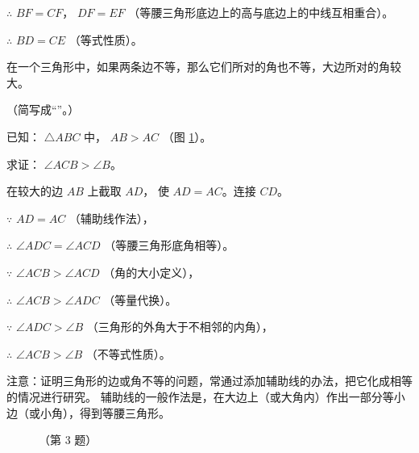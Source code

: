 $\therefore$ \quad $BF = CF$， $DF = EF$ （等腰三角形底边上的高与底边上的中线互相重合）。

$\therefore$ \quad $BD = CE$ （等式性质）。



%     

\liti \begin{xingzhi}
    在一个三角形中，如果两条边不等，那么它们所对的角也不等，大边所对的角较大。
\end{xingzhi}（简写成“”。）

已知： $\triangle ABC$ 中， $AB > AC$ （图 \ref{fig:czjh1-3-34}）。

求证： $\angle ACB > \angle B$。

\zhengming 在较大的边 $AB$ 上截取 $AD$， 使 $AD = AC$。连接 $CD$。

$\because$ \quad $AD = AC$ （辅助线作法），

$\therefore$ \quad $\angle ADC = \angle ACD$ （等腰三角形底角相等）。

$\because$ \quad $\angle ACB > \angle ACD$ （角的大小定义），

$\therefore$ \quad $\angle ACB > \angle ADC$ （等量代换）。

$\because$ \quad $\angle ADC > \angle B$ （三角形的外角大于不相邻的内角），

$\therefore$ \quad $\angle ACB > \angle B$ （不等式性质）。

注意：证明三角形的边或角不等的问题，常通过添加辅助线的办法，把它化成相等的情况进行研究。
辅助线的一般作法是，在大边上（或大角内）作出一部分等小边（或小角），得到等腰三角形。


\begin{figure}[htbp]
    \centering
    \begin{minipage}[b]{7cm}
        \centering
        
        \caption{}\label{fig:czjh1-3-34}
    \end{minipage}
    \qquad
    \begin{minipage}[b]{7cm}
        \centering
        
        \caption*{（第 3 题）}
    \end{minipage}
\end{figure}


